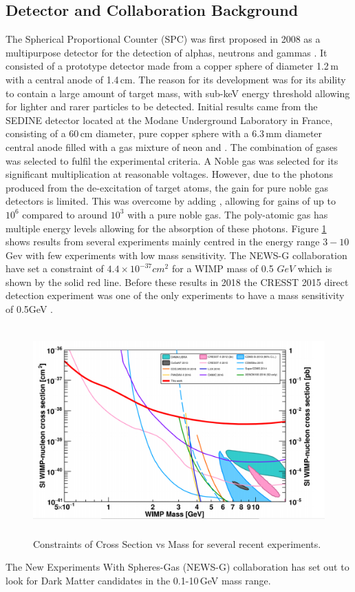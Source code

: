 \documentclass[a4paper]{article}
\begin{document}
\subsection{Detector and Collaboration Background}
The Spherical Proportional Counter (SPC) was first proposed in 2008 as a multipurpose detector for the detection of alphas, neutrons and gammas \cite{Giomataris_2008}. It consisted of a prototype detector made from a copper sphere of diameter 1.2\,m with a central anode of 1.4\,cm. The reason for its development was for its ability to contain a large amount of target mass, with sub-keV energy threshold allowing for lighter and rarer particles to be detected. 
\newline Initial results came from the SEDINE detector located at the Modane Underground Laboratory in France, consisting of a 60\,cm diameter, pure copper sphere with a 6.3\,mm diameter central anode filled with a gas mixture of neon and \cite{Arnaud_2018}. The combination of gases was selected to fulfil the experimental criteria. A Noble gas was selected for its significant multiplication at reasonable voltages. However, due to the photons produced from the de-excitation of target atoms, the gain for pure noble gas detectors is limited. This was overcome by adding , allowing for gains of up to $10^6$ compared to around $10^3$ with a pure noble gas\cite{fernow_1986}. The poly-atomic gas has multiple energy levels allowing for the absorption of these photons. Figure \ref{fig:Dark} shows results from several experiments mainly centred in the energy range $3-10$\,Gev with few experiments with low mass sensitivity. The NEWS-G collaboration have set a constraint of $4.4 \times 10^{-37} cm^2$ for a WIMP mass of 0.5 $GeV$ which is shown by the solid red line. Before these results in 2018 the CRESST 2015 direct detection experiment was one of the only experiments to have a mass sensitivity of 0.5GeV \cite{Angloher_2016}.
\begin{figure}[H]
    \centering
    \includegraphics[height=8cm]{Dark.png}
    \caption{Constraints of Cross Section vs Mass for several recent experiments\cite{Arnaud_2018}.}
    \label{fig:Dark}
\end{figure}
\noindent The New Experiments With Spheres-Gas (NEWS-G) collaboration has set out to look for Dark Matter candidates in the 0.1-10\,GeV mass range.
\end{document}
